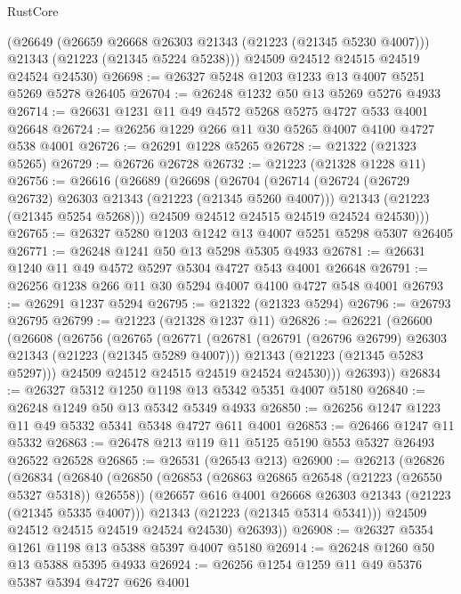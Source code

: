 \begin{lexlean}{RustCore}
\begin{coremodule}
      (@26649
        (@26659 @26668 @26303 @21343 (@21223 (@21345 @5230 @4007)))
        @21343
        (@21223 (@21345 @5224 @5238)))
      @24509
      @24512
      @24515
      @24519
      @24524
      @24530)
@26698 := @26327 @5248 @1203 @1233 @13 @4007 @5251 @5269 @5278 @26405
@26704 := @26248 @1232 @50 @13 @5269 @5276 @4933
@26714 := @26631 @1231 @11 @49 @4572 @5268 @5275 @4727 @533 @4001 @26648
@26724 := @26256 @1229 @266 @11 @30 @5265 @4007 @4100 @4727 @538 @4001
@26726 := @26291 @1228 @5265
@26728 := @21322 (@21323 @5265)
@26729 := @26726 @26728
@26732 := @21223 (@21328 @1228 @11)
@26756 := @26616
    (@26689
      (@26698
        (@26704
          (@26714
            (@26724 (@26729 @26732) @26303 @21343 (@21223 (@21345 @5260 @4007)))
            @21343
            (@21223 (@21345 @5254 @5268)))
          @24509
          @24512
          @24515
          @24519
          @24524
          @24530)))
@26765 := @26327 @5280 @1203 @1242 @13 @4007 @5251 @5298 @5307 @26405
@26771 := @26248 @1241 @50 @13 @5298 @5305 @4933
@26781 := @26631 @1240 @11 @49 @4572 @5297 @5304 @4727 @543 @4001 @26648
@26791 := @26256 @1238 @266 @11 @30 @5294 @4007 @4100 @4727 @548 @4001
@26793 := @26291 @1237 @5294
@26795 := @21322 (@21323 @5294)
@26796 := @26793 @26795
@26799 := @21223 (@21328 @1237 @11)
@26826 := @26221
    (@26600
      (@26608
        (@26756
          (@26765
            (@26771
              (@26781
                (@26791 (@26796 @26799) @26303 @21343 (@21223 (@21345 @5289 @4007)))
                @21343
                (@21223 (@21345 @5283 @5297)))
              @24509
              @24512
              @24515
              @24519
              @24524
              @24530)))
        @26393))
@26834 := @26327 @5312 @1250 @1198 @13 @5342 @5351 @4007 @5180
@26840 := @26248 @1249 @50 @13 @5342 @5349 @4933
@26850 := @26256 @1247 @1223 @11 @49 @5332 @5341 @5348 @4727 @611 @4001
@26853 := @26466 @1247 @11 @5332
@26863 := @26478 @213 @119 @11 @5125 @5190 @553 @5327 @26493 @26522 @26528
@26865 := @26531 (@26543 @213)
@26900 := @26213
    (@26826
      (@26834
        (@26840
          (@26850
            (@26853 (@26863 @26865 @26548 (@21223 (@26550 @5327 @5318)) @26558))
            (@26657 @616 @4001 @26668 @26303 @21343 (@21223 (@21345 @5335 @4007)))
            @21343
            (@21223 (@21345 @5314 @5341)))
          @24509
          @24512
          @24515
          @24519
          @24524
          @24530)
        @26393))
@26908 := @26327 @5354 @1261 @1198 @13 @5388 @5397 @4007 @5180
@26914 := @26248 @1260 @50 @13 @5388 @5395 @4933
@26924 := @26256 @1254 @1259 @11 @49 @5376 @5387 @5394 @4727 @626 @4001

\end{coremodule}
\end{lexlean}
